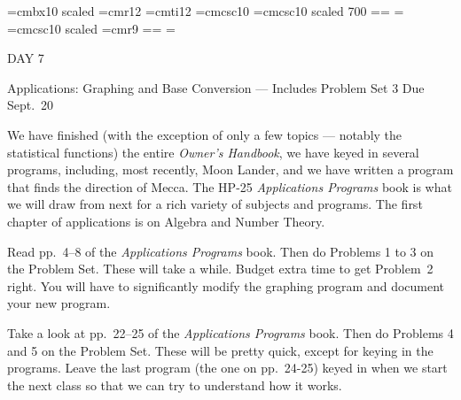 
\def\folio{\ifnum\pageno>0 \number\pageno \else
   \ifnum\pageno<0 \romannumeral-\pageno \else\fi\fi}

\font\largebf=cmbx10  scaled 
\font\largerm=cmr12
\font\largeit=cmti12
\font\tensc=cmcsc10
\font\sevensc=cmcsc10 scaled 700
\newfam\scfam \def\sc{\fam\scfam\tensc}
\textfont\scfam=\tensc \scriptfont\scfam=\sevensc
\scriptscriptfont\scfam=\sevensc
\font\largesc=cmcsc10 scaled 
\font\ninerm=cmr9
\newfam\srfam \def\sr{\fam\srfam\ninerm}
\textfont\srfam=\ninerm \scriptfont\srfam=\sevenrm
\scriptscriptfont\srfam=\fiverm




\null\vskip36pt

\centerline{\largerm DAY 7}
\nobreak\bigskip

\centerline{\largeit Applications: Graphing and Base Conversion --- Includes Problem Set 3 Due Sept.~20 }
\nobreak\bigskip

\nobreak\bigskip

\noindent We have finished (with the exception of only a few topics --- notably the statistical functions) the entire {\it Owner's Handbook}, we have keyed in several programs, including, most recently, Moon Lander, and we have written a program that finds the direction of Mecca. The HP-25 {\it Applications Programs} book is what we will draw from next for a rich variety of subjects and programs. The first chapter of applications is on Algebra and Number Theory.

\bigskip

\nobreak\bigskip

\noindent Read pp.~4--8 of the {\it Applications Programs} book. Then do Problems 1 to 3 on the Problem Set. These will take a while. Budget extra time to get Problem~2 right. You will have to significantly modify the graphing program and document your new program.

\bigskip

\nobreak\bigskip

\noindent Take a look at pp.~22--25 of the {\it Applications Programs} book. Then do Problems 4 and 5 on the Problem Set. These will be pretty quick, except for keying in the programs. Leave the last program (the one on pp.~24-25) keyed in when we start the next class so that we can try to understand how it works.


